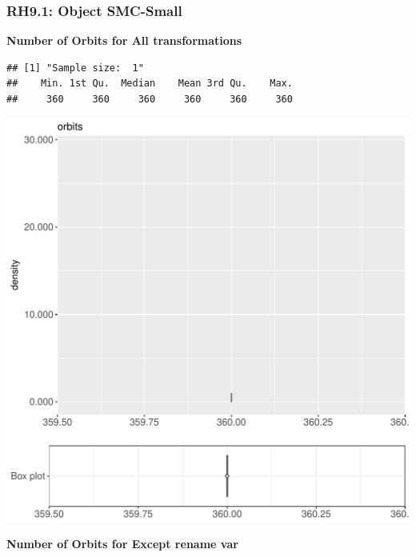 \documentclass{article}\usepackage[]{graphicx}\usepackage[]{color}
\makeatletter
\def\maxwidth{ %
  \ifdim\Gin@nat@width>\linewidth
    \linewidth
  \else
    \Gin@nat@width
  \fi
}
\newenvironment{kframe}{%
 \def\at@end@of@kframe{}%
 \ifinner\ifhmode%
  \def\at@end@of@kframe{\end{minipage}}%
  \begin{minipage}{\columnwidth}%
 \fi\fi%
 \def\FrameCommand##1{\hskip\@totalleftmargin \hskip-\fboxsep
 \colorbox{shadecolor}{##1}\hskip-\fboxsep
     \hskip-\linewidth \hskip-\@totalleftmargin \hskip\columnwidth}%
 \MakeFramed {\advance\hsize-\width
   \@totalleftmargin\z@ \linewidth\hsize
   \@setminipage}}%
 {\par\unskip\endMakeFramed%
 \at@end@of@kframe}
\newenvironment{knitrout}{}{} %
\makeatother
\begin{document}
\subsubsection{RH9.1: Object SMC-Small}

 \textbf{Number of Orbits for All transformations}
\begin{knitrout}
\color{fgcolor}\begin{kframe}
\begin{verbatim}
## [1] "Sample size:  1"
##    Min. 1st Qu.  Median    Mean 3rd Qu.    Max. 
##     360     360     360     360     360     360
\end{verbatim}


{\ttfamily\noindent\bfseries{}}\end{kframe}
\includegraphics[width=\maxwidth]{figure/RH9_cashew_small-1} 

\end{knitrout}
 \textbf{Number of Orbits for Except rename var}
\end{document}
